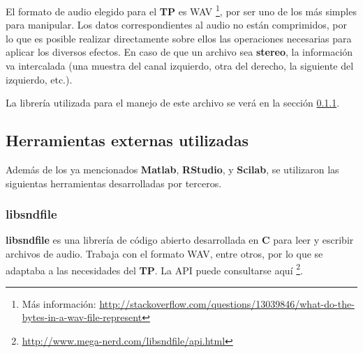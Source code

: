 \documentclass[a4paper,spanish,12pt]{article}
\begin{document}
El formato de audio elegido para el \textbf{TP} es WAV \footnote{Más información: \url{http://stackoverflow.com/questions/13039846/what-do-the-bytes-in-a-wav-file-represent}}, por ser uno de los más simples para manipular. Los datos correspondientes al audio no están comprimidos, por lo que es posible realizar directamente sobre ellos las operaciones necesarias para aplicar los diversos efectos. En caso de que un archivo sea \textbf{stereo}, la información va intercalada (una muestra del canal izquierdo, otra del derecho, la siguiente del izquierdo, etc.).\vspace{\baselineskip}

La librería utilizada para el manejo de este archivo se verá en la sección \ref{subsec:libsndfile}.\vspace{\baselineskip}


\newpage\subsection{Herramientas externas utilizadas}
\label{subsec:herramientas}
Además de los ya mencionados \textbf{Matlab}, \textbf{RStudio}, y \textbf{Scilab}, se utilizaron las siguientas herramientas desarrolladas por terceros.

\subsubsection{libsndfile}
\label{subsec:libsndfile}
\textbf{libsndfile} es una librería de código abierto desarrollada en \textbf{C} para leer y escribir archivos de audio. Trabaja con el formato WAV, entre otros, por lo que se adaptaba a las necesidades del \textbf{TP}. La API puede consultarse aquí \footnote{\url{http://www.mega-nerd.com/libsndfile/api.html}}.\vspace{\baselineskip}
\end{document}
